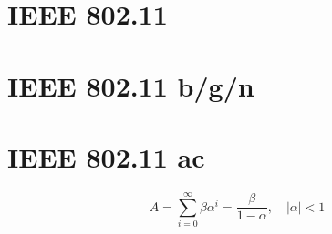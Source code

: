 \lipsum[1]

\section{IEEE 802.11}
\lipsum[1]

\section{IEEE 802.11 b/g/n}
\lipsum[1]

\section{IEEE 802.11 ac}

\lipsum[1]
\begin{displaymath}
  A=\sum_{i=0}^{\infty}\beta\alpha^i=\frac{\beta}{1-\alpha},\quad |\alpha|<1
\end{displaymath}
\lipsum[2]
